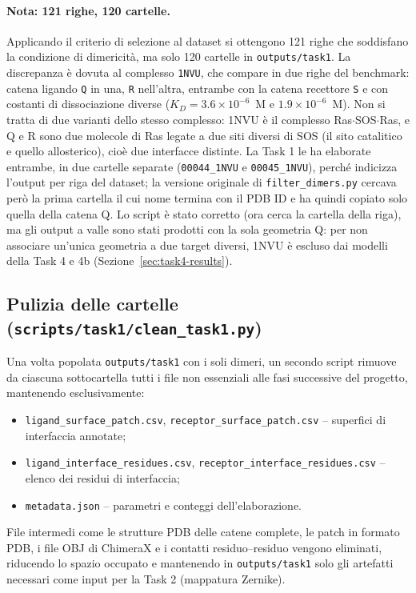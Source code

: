 \documentclass[11pt,a4paper]{article}
\begin{document}
\paragraph{Nota: 121 righe, 120 cartelle.} Applicando il criterio di selezione al dataset si ottengono 121 righe che soddisfano la condizione di dimericità, ma solo 120 cartelle in \texttt{outputs/task1}. La discrepanza è dovuta al complesso \texttt{1NVU}, che compare in due righe del benchmark: catena ligando \texttt{Q} in una, \texttt{R} nell'altra, entrambe con la catena recettore \texttt{S} e con costanti di dissociazione diverse ($K_D = 3.6\times10^{-6}$~M e $1.9\times10^{-6}$~M). Non si tratta di due varianti dello stesso complesso: 1NVU è il complesso Ras$\cdot$SOS$\cdot$Ras, e Q e R sono due molecole di Ras legate a due siti diversi di SOS (il sito catalitico e quello allosterico), cioè due interfacce distinte. La Task 1 le ha elaborate entrambe, in due cartelle separate (\texttt{00044\_1NVU} e \texttt{00045\_1NVU}), perché indicizza l'output per riga del dataset; la versione originale di \texttt{filter\_dimers.py} cercava però la prima cartella il cui nome termina con il PDB ID e ha quindi copiato solo quella della catena Q. Lo script è stato corretto (ora cerca la cartella della riga), ma gli output a valle sono stati prodotti con la sola geometria Q: per non associare un'unica geometria a due target diversi, 1NVU è escluso dai modelli della Task 4 e 4b (Sezione~\ref{sec:task4-results}).

\subsection{Pulizia delle cartelle (\texttt{scripts/task1/clean\_task1.py})}
Una volta popolata \texttt{outputs/task1} con i soli dimeri, un secondo script rimuove da ciascuna sottocartella tutti i file non essenziali alle fasi successive del progetto, mantenendo esclusivamente:
\begin{itemize}
    \item \texttt{ligand\_surface\_patch.csv}, \texttt{receptor\_surface\_patch.csv} -- superfici di interfaccia annotate;
    \item \texttt{ligand\_interface\_residues.csv}, \texttt{receptor\_interface\_residues.csv} -- elenco dei residui di interfaccia;
    \item \texttt{metadata.json} -- parametri e conteggi dell'elaborazione.
\end{itemize}
File intermedi come le strutture PDB delle catene complete, le patch in formato PDB, i file OBJ di ChimeraX e i contatti residuo--residuo vengono eliminati, riducendo lo spazio occupato e mantenendo in \texttt{outputs/task1} solo gli artefatti necessari come input per la Task 2 (mappatura Zernike).
\end{document}
